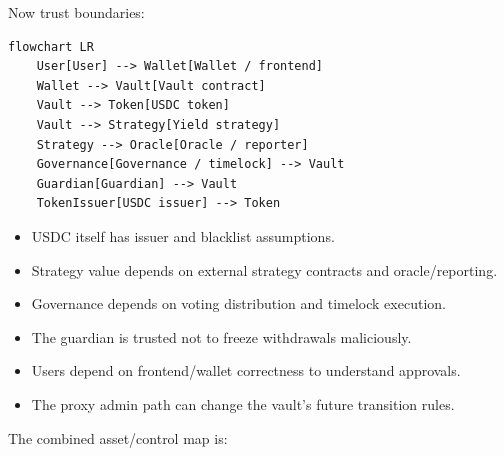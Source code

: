 Now trust boundaries:

\begin{lstlisting}
flowchart LR
    User[User] --> Wallet[Wallet / frontend]
    Wallet --> Vault[Vault contract]
    Vault --> Token[USDC token]
    Vault --> Strategy[Yield strategy]
    Strategy --> Oracle[Oracle / reporter]
    Governance[Governance / timelock] --> Vault
    Guardian[Guardian] --> Vault
    TokenIssuer[USDC issuer] --> Token
\end{lstlisting}

\begin{itemize}
\tightlist
\item
  USDC itself has issuer and blacklist assumptions.
\item
  Strategy value depends on external strategy contracts and
  oracle/reporting.
\item
  Governance depends on voting distribution and timelock execution.
\item
  The guardian is trusted not to freeze withdrawals maliciously.
\item
  Users depend on frontend/wallet correctness to understand approvals.
\item
  The proxy admin path can change the vault's future transition rules.
\end{itemize}

The combined asset/control map is:

